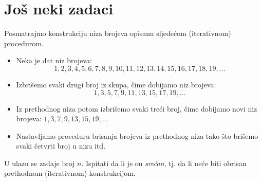  
 \section{Još neki zadaci}
 
 Posmatrajmo konstrukciju niza brojeva opisanu sljedećom (iterativnom) procedurom.
 
 \begin{itemize}
 	\item Neka je dat niz brojeva:
 	$$1, 2, 3, 4, 5, 6, 7, 8, 9, 10, 11, 12, 13, 14, 15, 16, 17, 18, 19,\ldots $$
 	\item Izbrišemo svaki drugi broj iz skupa, čime dobijamo niz brojeva:
 	$$1, 3, 5, 7, 9, 11, 13, 15, 17, 19,\ldots$$
 	\item Iz prethodnog niza potom izbrišemo svaki treći broj, čime dobijamo novi niz brojeva: $1, 3, 7, 9, 13, 15, 19,\ldots$
 	\item Nastavljamo proceduru brisanja brojeva iz prethodnog niza tako što brišemo svaki četvrti broj u nizu itd.
 \end{itemize} 
 
 U ulazu se zadaje broj $n$. Ispitati da li je on \emph{srećan}, tj. da li neće biti obrisan prethodnom (iterativnom) konstrukcijom. 
 
